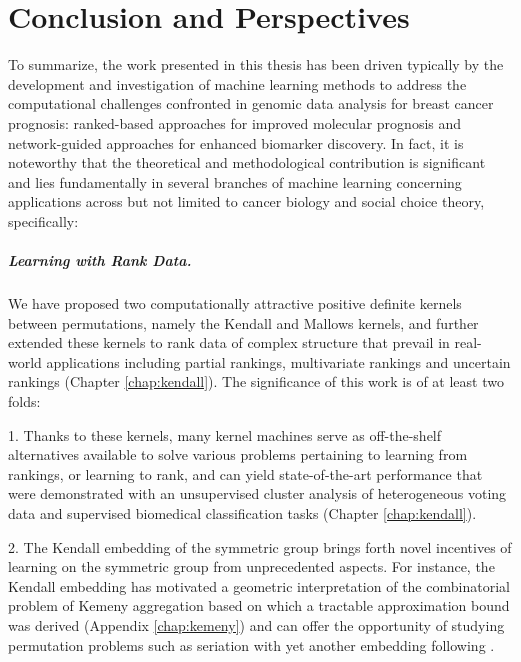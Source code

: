 \chapter{Conclusion and Perspectives}
\label{chap:conclusion}

To summarize, the work presented in this thesis has been driven typically by the development and investigation of machine learning methods to address the computational challenges confronted in genomic data analysis for breast cancer prognosis: ranked-based approaches for improved molecular prognosis and network-guided approaches for enhanced biomarker discovery. In fact, it is noteworthy that the theoretical and methodological contribution is significant and lies fundamentally in several branches of machine learning concerning applications across but not limited to cancer biology and social choice theory, specifically:


\paragraph{Learning with Rank Data.}

We have proposed two computationally attractive positive definite kernels between permutations, namely the Kendall and Mallows kernels, and further extended these kernels to rank data of complex structure that prevail in real-world applications including partial rankings, multivariate rankings and uncertain rankings (Chapter \ref{chap:kendall}). The significance of this work is of at least two folds: 
\begin{bulletList}
\item[1.] Thanks to these kernels, many kernel machines serve as off-the-shelf alternatives available to solve various problems pertaining to learning from rankings, or learning to rank, and can yield state-of-the-art performance that were demonstrated with an unsupervised cluster analysis of heterogeneous voting data and supervised biomedical classification tasks (Chapter \ref{chap:kendall}).
\item[2.] The Kendall embedding of the symmetric group brings forth novel incentives of learning on the symmetric group from unprecedented aspects. For instance, the Kendall embedding has motivated a geometric interpretation of the combinatorial problem of Kemeny aggregation based on which a tractable approximation bound was derived (Appendix \ref{chap:kemeny}) and can offer the opportunity of studying permutation problems such as seriation with yet another embedding following \cite{Fogel2013Convex, Lim2014Beyond}.
\end{bulletList}


